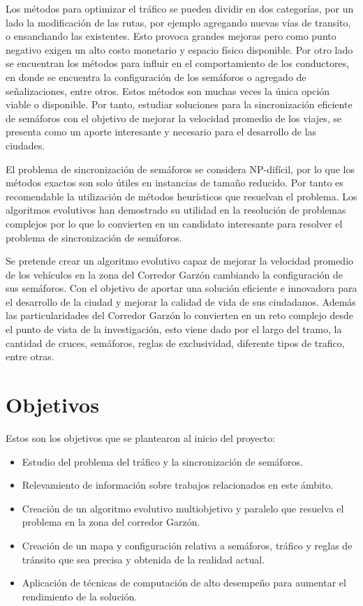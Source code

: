 Los métodos para optimizar el tráfico se pueden dividir en dos categorías, por un lado la modificación de las rutas, por ejemplo agregando nuevas vías de transito, o ensanchando las existentes. Esto provoca grandes mejoras pero como punto negativo exigen un alto costo monetario y espacio físico disponible. Por otro lado se encuentran los métodos para influir en el comportamiento de los conductores, en donde se encuentra la configuración de los semáforos o agregado de señalizaciones, entre otros. Estos métodos son muchas veces la única opción viable o disponible. Por tanto, estudiar soluciones para la sincronización eficiente de semáforos con el objetivo de mejorar la velocidad promedio de los viajes, se presenta como un aporte interesante y necesario para el desarrollo de las ciudades. 

El problema de sincronización de semáforos se considera NP-difícil, por lo que los métodos exactos son solo útiles en instancias de tamaño reducido. Por tanto es recomendable la utilización de métodos heurísticos que resuelvan el problema. Los algoritmos evolutivos han demostrado su utilidad en la resolución de problemas complejos por lo que lo convierten en un candidato interesante para resolver el problema de sincronización de semáforos. 

Se pretende crear un algoritmo evolutivo capaz de mejorar la velocidad promedio de los vehículos en la zona del Corredor Garzón cambiando la configuración de sus semáforos. Con el objetivo de aportar una solución eficiente e innovadora para el desarrollo de la ciudad y mejorar la calidad de vida de sus ciudadanos. Además las particularidades del Corredor Garzón lo convierten en un reto complejo desde el punto de vista de la investigación, esto viene dado por el largo del tramo, la cantidad de cruces, semáforos, reglas de exclusividad, diferente tipos de trafico, entre otras.



\section{Objetivos}

Estos son los objetivos que se plantearon al inicio del proyecto:

\begin{itemize}
	\item Estudio del problema del tráfico y la sincronización de semáforos.
	\item Relevamiento de información sobre trabajos relacionados en este ámbito.
	\item Creación de un algoritmo evolutivo multiobjetivo y paralelo que resuelva el problema en la zona del corredor Garzón.
	\item Creación de un mapa y configuración relativa a semáforos, tráfico y reglas de tránsito que sea precisa y obtenida de la realidad actual.	
	\item Aplicación de técnicas de computación de alto desempeño para aumentar el rendimiento de la solución.

\end{itemize}

